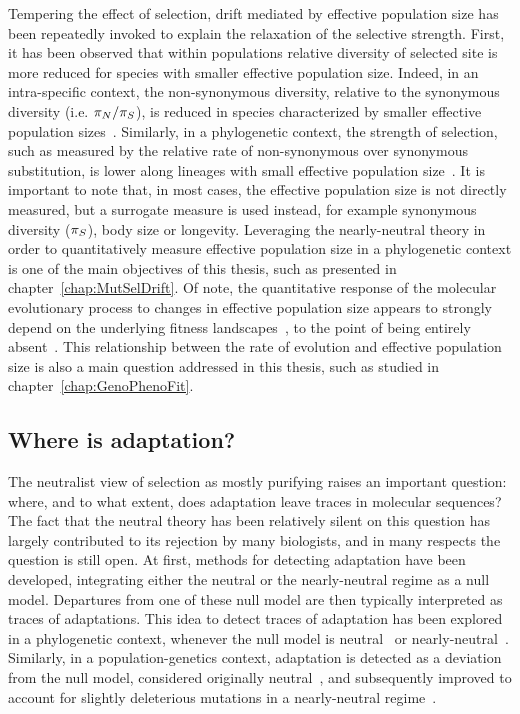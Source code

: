 Tempering the effect of selection, drift mediated by effective population size has been repeatedly invoked to explain the relaxation of the selective strength.
First, it has been observed that within populations relative diversity of selected site is more reduced for species with smaller effective population size.
Indeed, in an intra-specific context, the non-synonymous diversity, relative to the synonymous diversity (i.e. $\pi_N / \pi_S$), is reduced in species characterized by smaller effective population sizes~\citep{Piganeau2009, Elyashiv2010, Galtier2016, Chen2017, James2017}.
Similarly, in a phylogenetic context, the strength of selection, such as measured by the relative rate of non-synonymous over synonymous substitution, is lower along lineages with small effective population size~\citep{Ohta1993, Tomoko1995a, Moran1996, Woolfit2003, Woolfit2005, Popadin2007}.
It is important to note that, in most cases, the effective population size is not directly measured, but a surrogate measure is used instead, for example synonymous diversity ($\pi_S$), body size or longevity.
Leveraging the nearly-neutral theory in order to quantitatively measure effective population size in a phylogenetic context is one of the main objectives of this thesis, such as presented in chapter~\ref{chap:MutSelDrift}.
Of note, the quantitative response of the molecular evolutionary process to changes in effective population size appears to strongly depend on the underlying fitness landscapes~\citep{Welch2008}, to the point of being entirely absent~\citep{Cherry1998, Goldstein2013}.
This relationship between the rate of evolution and effective population size is also a main question addressed in this thesis, such as studied in chapter~\ref{chap:GenoPhenoFit}.

\subsection{Where is adaptation?}
\label{subsec:where-is-adaptation?}

The neutralist view of selection as mostly purifying raises an important question: where, and to what extent, does adaptation leave traces in molecular sequences?
The fact that the neutral theory has been relatively silent on this question has largely contributed to its rejection by many biologists, and in many respects the question is still open.
At first, methods for detecting adaptation have been developed, integrating either the neutral or the nearly-neutral regime as a null model.
Departures from one of these null model are then typically interpreted as traces of adaptations.
This idea to detect traces of adaptation has been explored in a phylogenetic context, whenever the null model is neutral~\citep{Goldman1994, Muse1994, Yang2002, Zhang2004} or nearly-neutral~\citep{Rodrigue2016, Bloom2017}.
Similarly, in a population-genetics context, adaptation is detected as a deviation from the null model, considered originally neutral~\citep{McDonald1991, Charlesworth1994, Smith2002}, and subsequently improved to account for slightly deleterious mutations in a nearly-neutral regime~\citep{eyre-walker_estimating_2009, Galtier2016}.

